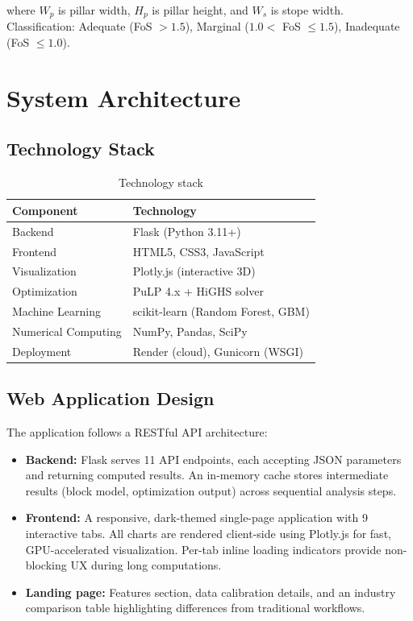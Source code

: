 \documentclass[12pt,a4paper]{article}
\begin{document}
where $W_p$ is pillar width, $H_p$ is pillar height, and $W_s$ is stope width. Classification: Adequate (FoS $> 1.5$), Marginal ($1.0 < $ FoS $\leq 1.5$), Inadequate (FoS $\leq 1.0$).

\section{System Architecture}
\label{sec:architecture}

\subsection{Technology Stack}

\begin{table}[H]
\centering
\caption{Technology stack}
\begin{tabular}{@{}ll@{}}
\toprule
\textbf{Component} & \textbf{Technology} \\
\midrule
Backend & Flask (Python 3.11+) \\
Frontend & HTML5, CSS3, JavaScript \\
Visualization & Plotly.js (interactive 3D) \\
Optimization & PuLP 4.x + HiGHS solver \\
Machine Learning & scikit-learn (Random Forest, GBM) \\
Numerical Computing & NumPy, Pandas, SciPy \\
Deployment & Render (cloud), Gunicorn (WSGI) \\
\bottomrule
\end{tabular}
\end{table}

\subsection{Web Application Design}

The application follows a RESTful API architecture:

\begin{itemize}[itemsep=0.2em]
    \item \textbf{Backend:} Flask serves 11 API endpoints, each accepting JSON parameters and returning computed results. An in-memory cache stores intermediate results (block model, optimization output) across sequential analysis steps.
    \item \textbf{Frontend:} A responsive, dark-themed single-page application with 9 interactive tabs. All charts are rendered client-side using Plotly.js for fast, GPU-accelerated visualization. Per-tab inline loading indicators provide non-blocking UX during long computations.
    \item \textbf{Landing page:} Features section, data calibration details, and an industry comparison table highlighting differences from traditional workflows.
\end{itemize}
\end{document}
